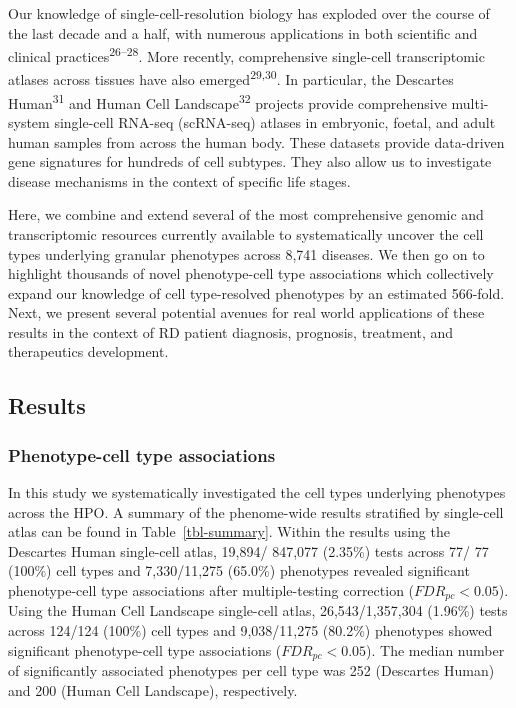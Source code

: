 \documentclass[
]{agujournal2019}
\begin{document}
Our knowledge of single-cell-resolution biology has exploded over the
course of the last decade and a half, with numerous applications in both
scientific and clinical practices\textsuperscript{26--28}. More
recently, comprehensive single-cell transcriptomic atlases across
tissues have also emerged\textsuperscript{29,30}. In particular, the
Descartes Human\textsuperscript{31} and Human Cell
Landscape\textsuperscript{32} projects provide comprehensive
multi-system single-cell RNA-seq (scRNA-seq) atlases in embryonic,
foetal, and adult human samples from across the human body. These
datasets provide data-driven gene signatures for hundreds of cell
subtypes. They also allow us to investigate disease mechanisms in the
context of specific life stages.

Here, we combine and extend several of the most comprehensive genomic
and transcriptomic resources currently available to systematically
uncover the cell types underlying granular phenotypes across 8,741
diseases. We then go on to highlight thousands of novel phenotype-cell
type associations which collectively expand our knowledge of cell
type-resolved phenotypes by an estimated 566-fold. Next, we present
several potential avenues for real world applications of these results
in the context of RD patient diagnosis, prognosis, treatment, and
therapeutics development.

\subsection{Results}\label{sec-results}

\subsubsection{Phenotype-cell type
associations}\label{phenotype-cell-type-associations}

In this study we systematically investigated the cell types underlying
phenotypes across the HPO. A summary of the phenome-wide results
stratified by single-cell atlas can be found in Table~\ref{tbl-summary}.
Within the results using the Descartes Human single-cell atlas, 19,894/
847,077 (2.35\%) tests across 77/ 77 (100\%) cell types and 7,330/11,275
(65.0\%) phenotypes revealed significant phenotype-cell type
associations after multiple-testing correction (\(FDR_{pc}<0.05\)).
Using the Human Cell Landscape single-cell atlas, 26,543/1,357,304
(1.96\%) tests across 124/124 (100\%) cell types and 9,038/11,275
(80.2\%) phenotypes showed significant phenotype-cell type associations
(\(FDR_{pc}<0.05\)). The median number of significantly associated
phenotypes per cell type was 252 (Descartes Human) and 200 (Human Cell
Landscape), respectively.
\end{document}
